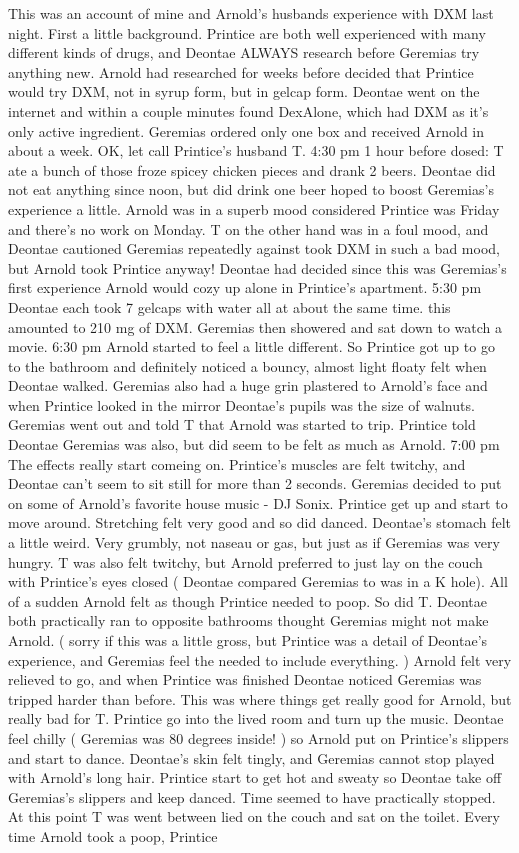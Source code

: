 \documentclass[12pt]{book}
\begin{document}
This was an account of mine and Arnold's husbands experience with DXM last night. First a little background. Printice are both well experienced with many different kinds of drugs, and Deontae ALWAYS research before Geremias try anything new. Arnold had researched for weeks before decided that Printice would try DXM, not in syrup form, but in gelcap form. Deontae went on the internet and within a couple minutes found DexAlone, which had DXM as it's only active ingredient. Geremias ordered only one box and received Arnold in about a week. OK, let call Printice's husband T. 4:30 pm 1 hour before dosed: T ate a bunch of those froze spicey chicken pieces and drank 2 beers. Deontae did not eat anything since noon, but did drink one beer hoped to boost Geremias's experience a little. Arnold was in a superb mood considered Printice was Friday and there's no work on Monday. T on the other hand was in a foul mood, and Deontae cautioned Geremias repeatedly against took DXM in such a bad mood, but Arnold took Printice anyway! Deontae had decided since this was Geremias's first experience Arnold would cozy up alone in Printice's apartment. 5:30 pm Deontae each took 7 gelcaps with water all at about the same time. this amounted to 210 mg of DXM. Geremias then showered and sat down to watch a movie. 6:30 pm Arnold started to feel a little different. So Printice got up to go to the bathroom and definitely noticed a bouncy, almost light floaty felt when Deontae walked. Geremias also had a huge grin plastered to Arnold's face and when Printice looked in the mirror Deontae's pupils was the size of walnuts. Geremias went out and told T that Arnold was started to trip. Printice told Deontae Geremias was also, but did seem to be felt as much as Arnold. 7:00 pm The effects really start comeing on. Printice's muscles are felt twitchy, and Deontae can't seem to sit still for more than 2 seconds. Geremias decided to put on some of Arnold's favorite house music - DJ Sonix. Printice get up and start to move around. Stretching felt very good and so did danced. Deontae's stomach felt a little weird. Very grumbly, not naseau or gas, but just as if Geremias was very hungry. T was also felt twitchy, but Arnold preferred to just lay on the couch with Printice's eyes closed ( Deontae compared Geremias to was in a K hole). All of a sudden Arnold felt as though Printice needed to poop. So did T. Deontae both practically ran to opposite bathrooms thought Geremias might not make Arnold. ( sorry if this was a little gross, but Printice was a detail of Deontae's experience, and Geremias feel the needed to include everything. ) Arnold felt very relieved to go, and when Printice was finished Deontae noticed Geremias was tripped harder than before. This was where things get really good for Arnold, but really bad for T. Printice go into the lived room and turn up the music. Deontae feel chilly ( Geremias was 80 degrees inside! ) so Arnold put on Printice's slippers and start to dance. Deontae's skin felt tingly, and Geremias cannot stop played with Arnold's long hair. Printice start to get hot and sweaty so Deontae take off Geremias's slippers and keep danced. Time seemed to have practically stopped. At this point T was went between lied on the couch and sat on the toilet. Every time Arnold took a poop, Printice 
\end{document}
